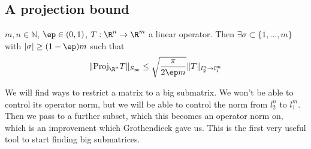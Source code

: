 \subsection{A projection bound}

\begin{lem} 
$m, n \in \mathbb{N}$, $\ep \in (0, 1)$, $T: \R^n \to \R^m$ a linear operator. Then $\exists \sigma \subset \{1, \ldots, m\}$ with $|\sigma| \geq (1 - \ep)m$ such that 
\[
\|\text{Proj}_{\R^{\sigma}} T\|_{S_{\infty}} \leq \sqrt{\frac{\pi}{2\ep m}} \|T\|_{l_2^n \to l_1^m}
\] 
\end{lem}
We will find ways to restrict a matrix to a big submatrix. We won't be able to control its operator norm, but we will be able to control the norm from $l_2^n$ to $l_1^m$. Then we pass to a further subset, which this becomes an operator norm on, which is an improvement which Grothendieck gave us. This is the first very useful tool to start finding big submatrices. 

